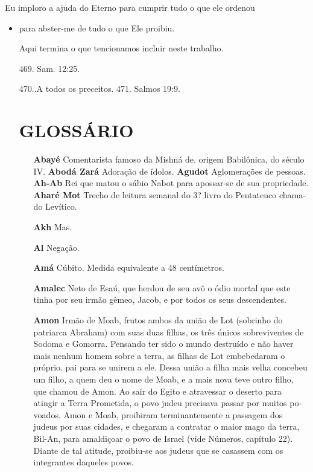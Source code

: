 \begin{itemize}
\begin{enumrate}
\begin{itemize}
\begin{itemize}
\begin{itemize}
Eu imploro a ajuda do Eterno para cumprir tudo o que ele ordenou

\begin{itemize}
\item
 
 para abster-me de tudo o que Ele proibiu.

Aqui termina o que tencionamos incluir neste trabalho.


469. Sam. 12:25.

470..A todos os preceitos. 471. Salmos 19:9.


\chapter{GLOSSÁRIO}


  \begingroup\footnotesize
\begin{itemize}

\item[\textbf{Abayé}] Comentarista famoso da Mish­ná de. origem Babilônica,
do século IV. \textbf{Abodá Zará} Adoração de ídolos. \textbf{Agudot} 
Aglomerações de pessoas. \textbf{Ah-Ab} Rei que matou o sábio Nabot
para apossar-se de sua propriedade. \textbf{Aharé Mot} Trecho de
leitura sema­nal do 3? livro do Pentateuco chama­do Levítico.

\item[\textbf{Akh}] Mas.

\item[\textbf{Al}] Negação.

\item[\textbf{Amá}] Cúbito. Medida equivalente a 48 centímetros.

\item[\textbf{Amalec}] Neto de Esaú, que herdou de seu avô o ódio mortal que
este tinha por seu irmão gêmeo, Jacob, e por to­dos os seus
descendentes.

\item[\textbf{Amon}] Irmão de Moab, frutos ambos da união de Lot (sobrinho do
patriar­ca Abraham) com suas duas filhas, os três únicos sobreviventes
de Sodoma e Gomorra. Pensando ter sido o mun­do destruído e não haver
mais nenhum homem sobre a terra, as filhas de Lot embebedaram o próprio.
pai para se unirem a ele. Dessa união a filha mais
velha concebeu um filho, a quem deu o nome de Moab, e a mais nova teve
outro filho, que chamou de Amon. Ao sair do Egito e atravessar o deserto
pa­ra atingir a Terra Prometida, o povo ju­deu precisava passar por
muitos po­voados. Amon e Moab, proibiram ter­minantemente a passagem dos
judeus por suas cidades, e chegaram a contra­tar o maior mago da terra,
Bil-An, para amaldiçoar o povo de Israel (vide Nú­meros, capítulo 22).
Diante de tal ati­tude, proibiu-se aos judeus que se ca­sassem com os
integrantes daqueles povos.


\end{itemize}
\end{itemize}
\end{itemize}
\end{itemize}
\end{itemize}
\end{enumrate}
\end{itemize}
